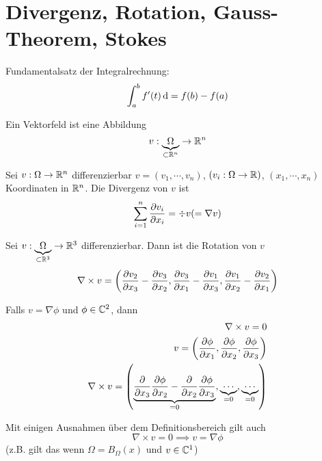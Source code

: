 \section{Divergenz, Rotation, Gauss-Theorem, Stokes}
Fundamentalsatz der Integralrechnung:
\[\int_a^b f'(t)\operatorname{d} = f(b)-f(a)\]
\begin{Def}
  Ein Vektorfeld ist eine Abbildung
  \[v:\underbrace{\Omega}_{\subset\mathbb{R}^n}\rightarrow\mathbb{R}^n\]
\end{Def}
\begin{Def}
  Sei $v:\Omega\rightarrow\mathbb{R}^n$ differenzierbar $v=(v_1,\cdots,v_n)$, $(v_i:\Omega\rightarrow\mathbb{R})$, $(x_1,\cdots,x_n)$ Koordinaten in $\mathbb{R}^n$. Die Divergenz von $v$ ist
  \[\sum^n_{i=1}\dfrac{\partial v_i}{\partial x_i} = \div v(=\nabla v)\]
\end{Def}
\begin{Def}
  Sei $v:\underbrace{\Omega}_{\subset\mathbb{R}^3}\rightarrow\mathbb{R}^3$ differenzierbar. Dann ist die Rotation von $v$
  \[\nabla\times v = \left( \dfrac{\partial v_2}{\partial x_3}-\dfrac{\partial v_3}{\partial x_2}, \dfrac{\partial v_3}{\partial x_1}-\dfrac{\partial v_1}{\partial x_3}, \dfrac{\partial v_1}{\partial x_2}-\dfrac{\partial v_2}{\partial x_1} \right)\]
\end{Def}
\begin{Bem}
  Falls $v=\nabla \phi$ und $\phi\in\mathbb{C}^2$, dann
  \begin{eqnarray*}
    \nabla\times v=0\\
    v=\left( \dfrac{\partial \phi}{\partial x_1},\dfrac{\partial \phi}{\partial x_2},\dfrac{\partial \phi}{\partial x_3} \right)\\
    \nabla\times v=\left( \underbrace{\dfrac{\partial }{\partial x_3}\dfrac{\partial \phi}{\partial x_2}-\dfrac{\partial }{\partial x_2}\dfrac{\partial \phi}{\partial x_3}}_{=0}, \underbrace{\cdots}_{=0}, \underbrace{\cdots}_{=0} \right)
  \end{eqnarray*}
\end{Bem}
\begin{Bem}
  Mit einigen Ausnahmen über dem Definitionsbereich gilt auch
  \[\nabla\times v=0\implies v=\nabla \phi\]
  (z.B. gilt das wenn $\Omega=B_{\Omega}(x)$ und $v\in\mathbb{C}^1$)
\end{Bem}
